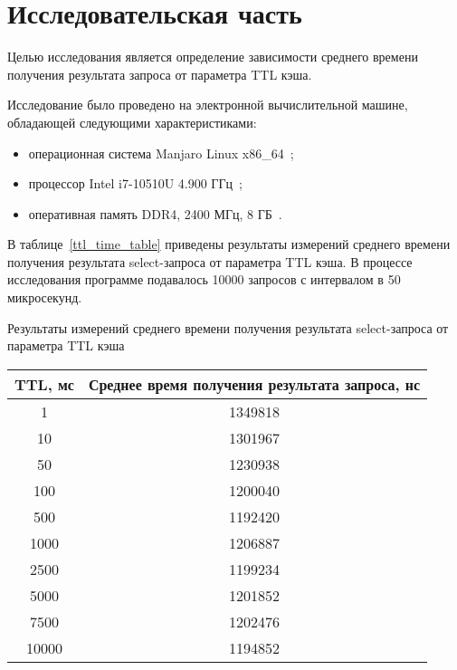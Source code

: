 \chapter{Исследовательская часть}

Целью исследования является определение зависимости среднего времени получения результата запроса от параметра TTL кэша.

Исследование было проведено на электронной вычислительной машине, обладающей следующими характеристиками:
\begin{itemize}
	\item операционная система Manjaro Linux x86\_64~\cite{manjaro};
	\item процессор Intel i7-10510U 4.900 ГГц~\cite{cpu};
	\item оперативная память DDR4, 2400 МГц, 8 ГБ~\cite{ram}.
\end{itemize}

В таблице~\ref{ttl_time_table} приведены результаты измерений среднего времени получения результата select-запроса от параметра TTL кэша. В процессе исследования программе подавалось 10000 запросов с интервалом в 50 микросекунд.
\begin{center}
	\begin{threeparttable}
		\captionsetup{justification=raggedright,singlelinecheck=off}
		\caption{\label{ttl_time_table}Результаты измерений среднего времени получения результата select-запроса от параметра TTL кэша}
		\centering
		\begin{tabular}{|c|c|}
			\hline
			TTL, мс & Среднее время получения результата запроса, нс \\
			\hline
			1 & 1349818 \\
			\hline
			10 & 1301967 \\
			\hline
			50 & 1230938 \\
			\hline
			100 & 1200040 \\
			\hline
			500 & 1192420 \\
			\hline
			1000 & 1206887 \\
			\hline
			2500 & 1199234 \\
			\hline
			5000 & 1201852 \\
			\hline
			7500 & 1202476 \\
			\hline
			10000 & 1194852 \\
			\hline
		\end{tabular}
	\end{threeparttable}
\end{center}

